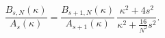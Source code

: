 \begin{equation}
\frac{B_{s,N}(\kappa)}{A_s(\kappa)}=\frac{B_{s+1,N}(\kappa)}{A_{s+1}(\kappa)}\,
\frac{\kappa^2+4s^2}{\kappa^2+\frac{16}{N^2}s^2}.
\label{B/As->B/As+1}
\end{equation}

